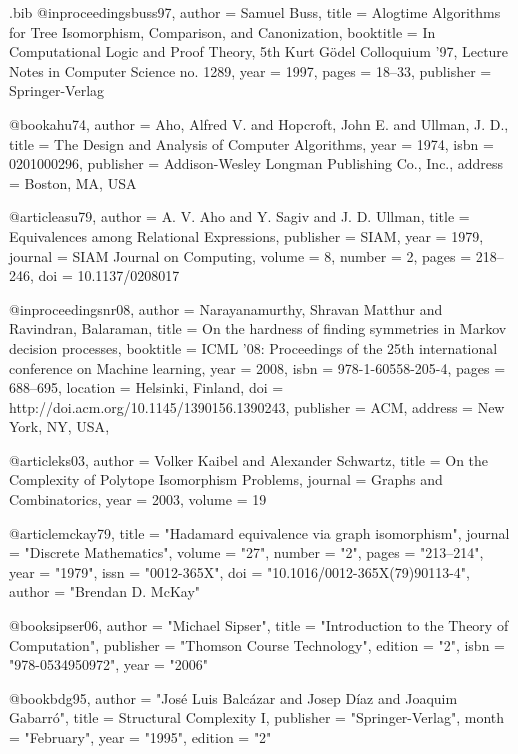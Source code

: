 \begin{filecontents*}{\jobname.bib}
@inproceedings{buss97,
 author = {Samuel Buss},
 title = {Alogtime Algorithms for Tree Isomorphism, Comparison, and
                  Canonization},
 booktitle = {In Computational Logic and Proof Theory, 5th Kurt G\"{o}del
                  Colloquium '97, Lecture Notes in Computer Science no. 1289},
 year = {1997},
 pages = {18--33},
 publisher = {Springer-Verlag}
}

@book{ahu74,
 author = {Aho, Alfred V. and Hopcroft, John E. and Ullman, J. D.},
 title = {The Design and Analysis of Computer Algorithms},
 year = {1974},
 isbn = {0201000296},
 publisher = {Addison-Wesley Longman Publishing Co., Inc.},
 address = {Boston, MA, USA}
}

@article{asu79,
 author = {A. V. Aho and Y. Sagiv and J. D. Ullman},
 title = {Equivalences among Relational Expressions},
 publisher = {SIAM},
 year = {1979},
 journal = {SIAM Journal on Computing},
 volume = {8},
 number = {2},
 pages = {218--246},
 doi = {10.1137/0208017}
}

@inproceedings{nr08,
 author = {Narayanamurthy, Shravan Matthur and Ravindran, Balaraman},
 title = {On the hardness of finding symmetries in Markov decision processes},
 booktitle = {ICML '08: Proceedings of the 25th international conference on
                  Machine learning},
 year = {2008},
 isbn = {978-1-60558-205-4},
 pages = {688--695},
 location = {Helsinki, Finland},
 doi = {http://doi.acm.org/10.1145/1390156.1390243},
 publisher = {ACM},
 address = {New York, NY, USA},
}

@article{ks03,
 author = {Volker Kaibel and Alexander Schwartz},
 title = {On the Complexity of Polytope Isomorphism Problems},
 journal = {Graphs and Combinatorics},
 year = {2003},
 volume = {19}
}

@article{mckay79,
 title = "Hadamard equivalence via graph isomorphism",
 journal = "Discrete Mathematics",
 volume = "27",
 number = "2",
 pages = "213--214",
 year = "1979",
 issn = "0012-365X",
 doi = "10.1016/0012-365X(79)90113-4",
 author = "Brendan D. McKay"
}

@book{sipser06,
 author = "Michael Sipser",
 title = "Introduction to the Theory of Computation",
 publisher = "Thomson Course Technology",
 edition = "2",
 isbn = "978-0534950972",
 year = "2006" 
}

@book{bdg95, 
 author = "Jos\'{e} Luis Balc\'{a}zar and Josep D\'{i}az and Joaquim
                  Gabarr\'{o}",
 title = {{Structural Complexity I}},
 publisher = "Springer-Verlag",
 month = "February",
 year = "1995",
 edition = "2"
}


\end{filecontents*}
